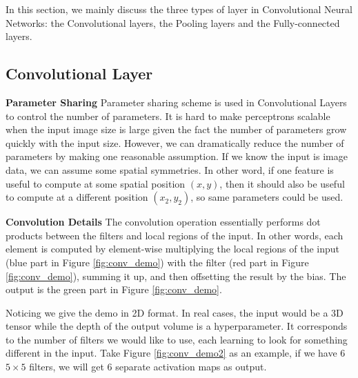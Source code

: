 \documentclass[twoside]{article}
\begin{document}
In this section, we mainly discuss the three types of layer in Convolutional Neural Networks: the Convolutional layers, the Pooling layers and the Fully-connected layers.

\subsection{Convolutional Layer}
\textbf{Parameter Sharing}
Parameter sharing scheme is used in Convolutional Layers to control the number of parameters. It is hard to make perceptrons scalable when the input image size is large given the fact the number of parameters grow quickly with the input size. However, we can dramatically reduce the number of parameters by making one reasonable assumption. If we know the input is image data, we can assume some spatial symmetries. In other word, if one feature is useful to compute at some spatial position $(x,y)$, then it should also be useful to compute at a different position $(x_2,y_2)$, so same parameters could be used.

\textbf{Convolution Details}
The convolution operation essentially performs dot products between the filters and local regions of the input. In other words, each element is computed by element-wise multiplying the local regions of the input (blue part in Figure \ref{fig:conv_demo}) with the filter (red part in Figure \ref{fig:conv_demo}), summing it up, and then offsetting the result by the bias. The output is the green part in Figure \ref{fig:conv_demo}.

Noticing we give the demo in 2D format. In real cases, the input would be a 3D tensor while the depth of the output volume is a hyperparameter. It corresponds to the number of filters we would like to use, each learning to look for something different in the input. Take Figure \ref{fig:conv_demo2} as an example, if we have 6 $5\times5$ filters, we will get 6 separate activation maps as output.
\end{document}
